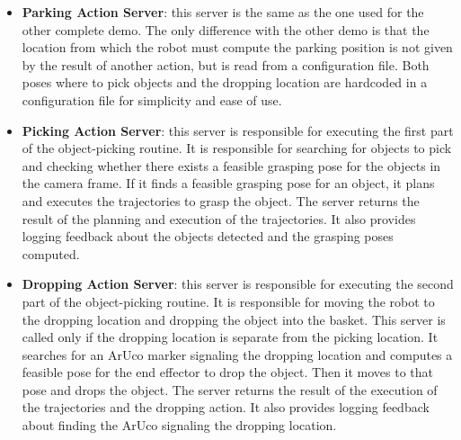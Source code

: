 \begin{itemize}
    \item \textbf{Parking Action Server}: this server is the same as the one used for the other complete demo.
    The only difference with the other demo is that the location from which the robot must compute
    the parking position is not given by the result of another action, but is read from a configuration file.
    Both poses where to pick objects and the dropping location are hardcoded in a configuration file for
    simplicity and ease of use.
    \item \textbf{Picking Action Server}: this server is responsible for executing the first part of the
    object-picking routine. It is responsible for searching for objects to pick and checking whether there
    exists a feasible grasping pose for the objects in the camera frame. If it finds a feasible grasping pose
    for an object, it plans and executes the trajectories to grasp the object. The server returns the result
    of the planning and execution of the trajectories. It also provides logging feedback about the objects
    detected and the grasping poses computed.
    \item \textbf{Dropping Action Server}: this server is responsible for executing the second part of the
    object-picking routine. It is responsible for moving the robot to the dropping location and dropping the object
    into the basket. This server is called only if the dropping location is separate from the picking location.
    It searches for an ArUco marker signaling the dropping location and computes a feasible pose for the end effector
    to drop the object. Then it moves to that pose and drops the object.
    The server returns the result of the execution of the trajectories and the dropping action.
    It also provides logging feedback about finding the ArUco signaling the dropping location. 
\end{itemize}
